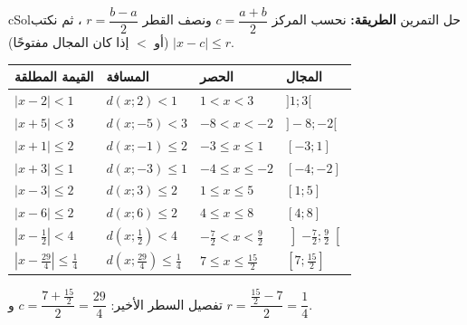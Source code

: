 \documentclass[12pt,a4paper]{article}
\newcounter{exo}
\newenvironment{hal}{\Needspace{12\baselineskip}\begin{otherlanguage}{english}\begin{arbox}[breakable]{cSol}{حل التمرين \theexo}}{\end{arbox}\end{otherlanguage}}
\begin{document}
\begin{hal}
\textbf{الطريقة:} نحسب المركز $c=\dfrac{a+b}2$ ونصف القطر $r=\dfrac{b-a}2$ ، ثم نكتب $|x-c|\leqslant r$ (أو $<$ إذا كان المجال مفتوحًا).
\begin{center}
\renewcommand{\arraystretch}{1.6}
\begin{tabular}{|>{\centering\arraybackslash}p{}|>{\centering\arraybackslash}p{}|>{\centering\arraybackslash}p{}|>{\centering\arraybackslash}p{}|}\hline
\rowcolor{cSec!12}\textbf{القيمة المطلقة} & \textbf{المسافة} & \textbf{الحصر} & \textbf{المجال}\\\hline
$|x-2|<1$ & $d(x;2)<1$ & $1<x<3$ & $]1;3[$\\\hline
$|x+5|<3$ & $d(x;-5)<3$ & $-8<x<-2$ & $]-8;-2[$\\\hline
$|x+1|\leqslant2$ & $d(x;-1)\leqslant2$ & $-3\leqslant x\leqslant1$ & $[-3;1]$\\\hline
$|x+3|\leqslant1$ & $d(x;-3)\leqslant1$ & $-4\leqslant x\leqslant-2$ & $[-4;-2]$\\\hline
$|x-3|\leqslant2$ & $d(x;3)\leqslant2$ & $1\leqslant x\leqslant5$ & $[1;5]$\\\hline
$|x-6|\leqslant2$ & $d(x;6)\leqslant2$ & $4\leqslant x\leqslant8$ & $[4;8]$\\\hline
$\left|x-\frac12\right|<4$ & $d\left(x;\frac12\right)<4$ & $-\frac72<x<\frac92$ & $\left]-\frac72;\frac92\right[$\\\hline
$\left|x-\frac{29}4\right|\leqslant\frac14$ & $d\left(x;\frac{29}4\right)\leqslant\frac14$ & $7\leqslant x\leqslant\frac{15}2$ & $\left[7;\frac{15}2\right]$\\\hline
\end{tabular}
\end{center}
تفصيل السطر الأخير: \quad $c=\dfrac{7+\frac{15}2}2=\dfrac{29}4$ \quad و \quad $r=\dfrac{\frac{15}2-7}2=\dfrac14$.
\end{hal}

\end{document}
